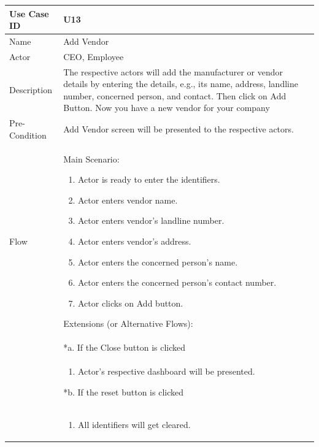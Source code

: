 \documentclass[12pt,a4paper]{report}
\begin{document}
\begin{tabular}{ | m{3cm} | m{12cm}| } \hline

Use Case ID &  U13 \\\hline

Name  	    &  Add Vendor\\ \hline

Actor     	& CEO, Employee \\ \hline

Description &  The respective actors will add the manufacturer or vendor details by entering the details, e.g.,  its name, address, landline number, concerned person, and contact. Then click on Add Button. Now you have a new vendor for your company \\ \hline

Pre-Condition &  Add Vendor screen will be presented to the respective actors. \\ \hline

Flow & Main Scenario:

\begin{enumerate}

\item Actor is ready to enter the identifiers.
\item Actor enters vendor name.
\item Actor enters vendor's landline number.
\item Actor enters vendor's address.
\item Actor enters the concerned person's name.
\item Actor enters the concerned person's contact number.
\item Actor clicks on Add button.
\end{enumerate}



Extensions (or Alternative Flows):\\
& *a. If the Close button is clicked \\
& \begin{enumerate}
		\item Actor's respective dashboard will be presented.
	\end{enumerate}
*b. If the reset button is clicked \\
&	\begin{enumerate}
		\item All identifiers will get cleared.
	\end{enumerate}
\\ \hline
\end{tabular}
\end{document}

